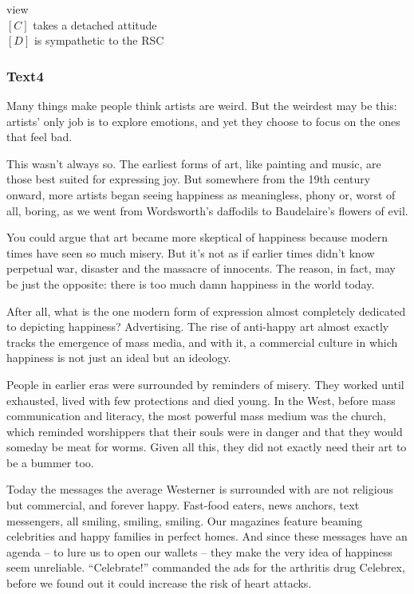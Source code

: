 \documentclass[a4paper]{article}
\begin{document}
view\\$[C]$ takes a detached attitude\\$[D]$ is sympathetic to the RSC\\\subsubsection{Text4}

\par
Many things make people think artists are weird. But the weirdest may be this: artists’ only job is to explore emotions, and yet they choose to focus on the ones that feel bad.

\par
This wasn’t always so. The earliest forms of art, like painting and music, are those best suited for expressing joy. But somewhere from the 19th century onward, more artists began seeing happiness as meaningless, phony or, worst of all, boring, as we went from Wordsworth’s daffodils to Baudelaire’s flowers of evil.

\par
You could argue that art became more skeptical of happiness because modern times have seen so much misery. But it’s not as if earlier times didn’t know perpetual war, disaster and the massacre of innocents. The reason, in fact, may be just the opposite: there is too much damn happiness in the world today.

\par
After all, what is the one modern form of expression almost completely dedicated to depicting happiness? Advertising. The rise of anti-happy art almost exactly tracks the emergence of mass media, and with it, a commercial culture in which happiness is not just an ideal but an ideology.

\par
People in earlier eras were surrounded by reminders of misery. They worked until exhausted, lived with few protections and died young. In the West, before mass communication and literacy, the most powerful mass medium was the church, which reminded worshippers that their souls were in danger and that they would someday be meat for worms. Given all this, they did not exactly need their art to be a bummer too.

\par
Today the messages the average Westerner is surrounded with are not religious but commercial, and forever happy. Fast-food eaters, news anchors, text messengers, all smiling, smiling, smiling. Our magazines feature beaming celebrities and happy families in perfect homes. And since these messages have an agenda -- to lure us to open our wallets -- they make the very idea of happiness seem unreliable. “Celebrate!” commanded the ads for the arthritis drug Celebrex, before we found out it could increase the risk of heart attacks.
\end{document}
